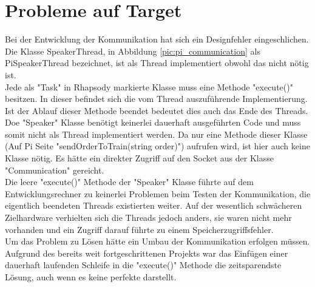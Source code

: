 \section{Probleme auf Target}
\label{sec:problems_target}

Bei der Entwicklung der Kommunikation hat sich ein Designfehler eingeschlichen. Die Klasse SpeakerThread, in Abbildung \ref{pic:pi_communication} als PiSpeakerThread bezeichnet, ist als Thread implementiert obwohl das nicht nötig ist.\\
Jede als "Task" in Rhapsody markierte Klasse muss eine Methode "execute()" besitzen. In dieser befindet sich die vom Thread auszuführende Implementierung. Ist der Ablauf dieser Methode beendet bedeutet dies auch das Ende des Threads.\\
Doe "Speaker" Klasse benötigt keinerlei dauerhaft ausgeführten Code und muss somit nicht als Thread implementiert werden. Da nur eine Methode dieser Klasse (Auf Pi Seite "sendOrderToTrain(string order)") aufrufen wird, ist hier auch keine Klasse nötig. Es hätte ein direkter Zugriff auf den Socket aus der Klasse "Communication" gereicht.\\
Die leere "execute()" Methode der "Speaker" Klasse führte auf dem Entwicklungsrechner zu keinerlei Problemen beim Testen der Kommunikation, die eigentlich beendeten Threads existierten weiter. Auf der wesentlich schwächeren Zielhardware verhielten sich die Threads jedoch anders, sie waren nicht mehr vorhanden und ein Zugriff darauf führte zu einem Speicherzugriffsfehler.\\
Um das Problem zu Lösen hätte ein Umbau der Kommunikation erfolgen müssen. Aufgrund des bereits weit fortgeschrittenen Projekts war das Einfügen einer dauerhaft laufenden Schleife in die "execute()" Methode die zeitsparendste Lösung, auch wenn es keine perfekte darstellt.